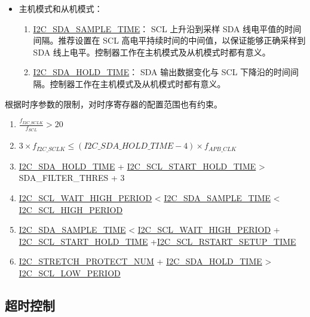 \documentclass[main\_\_CN.tex]{subfiles}
\begin{document}
\begin{itemize}
\item 主机模式和从机模式：

\begin{enumerate}

\item \hyperref[fielddesc:I2CSDASAMPLETIME]{I2C\_SDA\_SAMPLE\_TIME}：
SCL 上升沿到采样 SDA 线电平值的时间间隔。推荐设置在 SCL 高电平持续时间的中间值，以保证能够正确采样到 SDA 线上电平。控制器工作在主机模式及从机模式时都有意义。

\item \hyperref[fielddesc:I2CSDAHOLDTIME]{I2C\_SDA\_HOLD\_TIME}：
SDA 输出数据变化与 SCL 下降沿的时间间隔。控制器工作在主机模式及从机模式时都有意义。

\end{enumerate}
\end{itemize}

根据时序参数的限制，对时序寄存器的配置范围也有约束。

\begin{enumerate}
\item $\frac{f_{I2C\_SCLK}}{f_{SCL}} > 20$
\item $3 \times f_{I2C\_SCLK} \leq (\hyperref[fielddesc:I2CSDAHOLDTIME]{I2C\_SDA\_HOLD\_TIME}-4) \times f_{APB\_CLK}$
\item \hyperref[fielddesc:I2CSDAHOLDTIME]{I2C\_SDA\_HOLD\_TIME} + \hyperref[fielddesc:I2CSCLSTARTHOLDTIME]{I2C\_SCL\_START\_HOLD\_TIME} > SDA\_FILTER\_THRES + 3
\item \hyperref[fielddesc:I2CSCLWAITHIGHPERIOD]{I2C\_SCL\_WAIT\_HIGH\_PERIOD} < \hyperref[fielddesc:I2CSDASAMPLETIME]{I2C\_SDA\_SAMPLE\_TIME} < \hyperref[fielddesc:I2CSCLHIGHPERIOD]{I2C\_SCL\_HIGH\_PERIOD}
\item \hyperref[fielddesc:I2CSDASAMPLETIME]{I2C\_SDA\_SAMPLE\_TIME} < \hyperref[fielddesc:I2CSCLWAITHIGHPERIOD]{I2C\_SCL\_WAIT\_HIGH\_PERIOD} + \hyperref[fielddesc:I2CSCLSTARTHOLDTIME]{I2C\_SCL\_START\_HOLD\_TIME} +\hyperref[fielddesc:I2CSCLRSTARTSETUPTIME]{I2C\_SCL\_RSTART\_SETUP\_TIME}
\item \hyperref[fielddesc:I2CSTRETCHPROTECTNUM]{I2C\_STRETCH\_PROTECT\_NUM} + \hyperref[fielddesc:I2CSDAHOLDTIME]{I2C\_SDA\_HOLD\_TIME} > \hyperref[fielddesc:I2CSCLLOWPERIOD]{I2C\_SCL\_LOW\_PERIOD}
\end{enumerate}

\subsection{超时控制}
\end{document}
